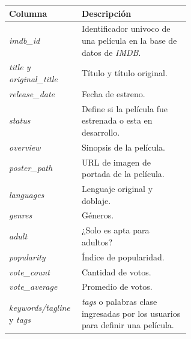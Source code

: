 \documentclass[11pt,a4paper,twoside]{thesis}
\begin{document}
\begin{table}[!htb]
	\centering
	\footnotesize
	\begin{tabular}{l | p{0.6\linewidth}}
		\hline
		Columna                                   & Descripción                                                                           \\
		\hline
		\textit{imdb\_id}                         & Identificador univoco de una película en la base de datos de \textit{IMDB}.           \\
		\textit{title y original\_title}          & Título y título original.                                                             \\
		\textit{release\_date}                    & Fecha de estreno.                                                                     \\
		\textit{status}                           & Define si la película fue estrenada o esta en desarrollo.                             \\
		\textit{overview}                         & Sinopsis de la película.                                                              \\
		\textit{poster\_path}                     & URL de imagen de portada de la película.                                              \\
		\textit{languages}                        & Lenguaje original y doblaje.                                                          \\
		\textit{genres}                           & Géneros.                                                                              \\
		\textit{adult}                            & ¿Solo es apta para adultos?                                                           \\
		\textit{popularity}                       & Índice de popularidad.                                                                \\
		\textit{vote\_count}                      & Cantidad de votos.                                                                    \\
		\textit{vote\_average}                    & Promedio de votos.                                                                    \\
		\textit{keywords/tagline} y \textit{tags} & \textit{tags} o palabras clase ingresadas por los usuarios para definir una película. \\

\end{tabular}
\end{table}
\end{document}
